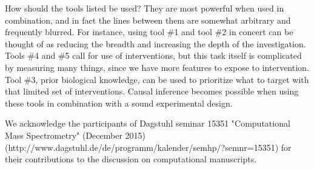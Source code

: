 \documentclass[journal=jacsat,manuscript=article]{achemso}
\begin{document}
How should the tools listed be used? They are most powerful when used in
combination, and in fact the lines between them are somewhat arbitrary
and frequently blurred. For instance, using tool \#1 and tool \#2 in
concert can be thought of as reducing the breadth and increasing the
depth of the investigation. Tools \#4 and \#5 call for use of
interventions, but this task itself is complicated by measuring many
things, since we have more features to expose to intervention. Tool
\#3, prior biological knowledge, can be used to prioritize what to
target with that limited set of interventions.  Causal inference becomes possible when using these tools in combination with a sound experimental design.

\begin{acknowledgement}
We acknowledge the participants of Dagstuhl seminar 15351 "Computational Mass Spectrometry" (December 2015) (http://www.dagstuhl.de/de/programm/kalender/semhp/?semnr=15351) for their contributions to the discussion on computational manuscripts.
\end{acknowledgement}

\end{document}
